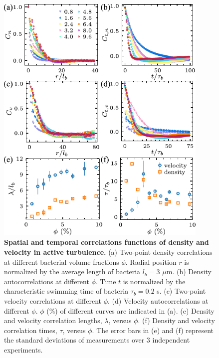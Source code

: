 \begin{figure}[!h]
\begin{center}
\includegraphics[width=4in]{figs/5-GNF/3.pdf}
\caption[Spatial and Temporal Correlation Functions in Active Turbulence]
{
\textbf{Spatial and temporal correlations functions of density and velocity in active turbulence.}
(a) Two-point density correlations at different bacterial volume fractions $\phi$. Radial position $r$ is normalized by the average length of bacteria $l_b = 3$ $\mu$m.
(b) Density autocorrelations at different $\phi$. Time $t$ is normalized by the characteristic swimming time of bacteria $\tau_b = 0.2$ s.
(c) Two-point velocity correlations at different $\phi$.
(d) Velocity autocorrelations at different $\phi$. $\phi$ ($\%$) of different curves are indicated in (a).
(e) Density and velocity correlation lengths, $\lambda$, versus $\phi$.
(f) Density and velocity correlation times, $\tau$, versus $\phi$.
The error bars in (e) and (f) represent the standard deviations of measurements over 3 independent experiments.
}
\label{fig:spatiotemporal-correlations}
\end{center}
\end{figure}

